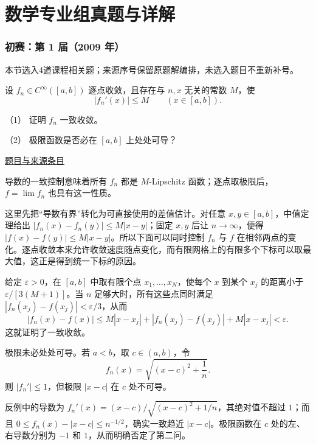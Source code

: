 \documentclass[UTF8,12pt,a4paper,fontset=fandol]{ctexart}
\begin{document}
\part{数学专业组真题与详解}

\section{初赛：第 1 届（2009 年）}

本节选入4道课程相关题；来源序号保留原题解编排，未选入题目不重新补号。

\begin{example}[来源序号4]\label{ex:pre01-math:4}\label{pr:pre01-math:4}

设 $f_n\in C^\infty([a,b])$ 逐点收敛，且存在与 $n,x$ 无关的常数 $M$，使
\[
|f_n'(x)|\le M\qquad(x\in[a,b]).
\]

（1） 证明 $f_n$ 一致收敛。

（2） 极限函数是否必在 $[a,b]$ 上处处可导？

\par\href{https://github.com/lzxcr/cmc-mathematics/blob/64916fa1fdbc3e444a652eca204d5669058ee321/src/problems/preliminary/01/04.md}{题目与来源条目}

\end{example}

\begin{solve}\label{ans:pre01-math:4}

导数的一致控制意味着所有 $f_n$ 都是 $M$-Lipschitz 函数；逐点取极限后，$f=\lim f_n$ 也具有这一性质。

这里先把“导数有界”转化为可直接使用的差值估计。对任意 $x,y\in[a,b]$，中值定理给出 $|f_n(x)-f_n(y)|\le M|x-y|$；固定 $x,y$ 后让 $n\to\infty$，便得 $|f(x)-f(y)|\le M|x-y|$。所以下面可以同时控制 $f_n$ 与 $f$ 在相邻两点的变化。逐点收敛本来允许收敛速度随点变化，而有限网格上的有限多个下标可以取最大值，这正是得到统一下标的原因。

给定 $\varepsilon>0$，在 $[a,b]$ 中取有限个点 $x_1,\ldots,x_N$，使每个 $x$ 到某个 $x_j$ 的距离小于 $\varepsilon/[3(M+1)]$。当 $n$ 足够大时，所有这些点同时满足 $|f_n(x_j)-f(x_j)|<\varepsilon/3$，从而
\[
|f_n(x)-f(x)|
\le M|x-x_j|+|f_n(x_j)-f(x_j)|+M|x-x_j|<\varepsilon.
\]
这就证明了一致收敛。

极限未必处处可导。若 $a<b$，取 $c\in(a,b)$，令
\[
f_n(x)=\sqrt{(x-c)^2+\frac1n}.
\]
则 $|f_n'|\le1$，但极限 $|x-c|$ 在 $c$ 处不可导。

反例中的导数为 $f_n'(x)=(x-c)/\sqrt{(x-c)^2+1/n}$，其绝对值不超过 $1$；而且 $0\le f_n(x)-|x-c|\le n^{-1/2}$，确实一致趋近 $|x-c|$。极限函数在 $c$ 处的左、右导数分别为 $-1$ 和 $1$，从而明确否定了第二问。

\end{solve}
\end{document}

